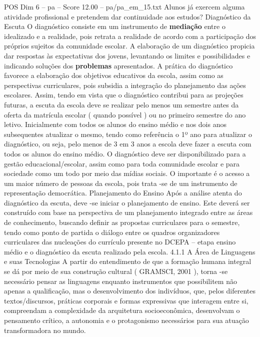 \begin{textsample}{POS Dim 6 – pa – Score 12.00 – pa/pa\_em\_15.txt}  \label{ex:f6_pos_062}
Alunos já exercem alguma atividade profissional e pretendem dar continuidade aos estudos?
Diagnóstico da Escuta O diagnóstico consiste em um instrumento de \textbf{mediação} entre o idealizado e a realidade, pois retrata a realidade de acordo com a participação dos próprios sujeitos da comunidade escolar.
A elaboração de um diagnóstico propicia dar respostas às expectativas dos jovens, levantando os limites e possibilidades e indicando soluções dos \textbf{problemas} apresentados.
A prática do diagnóstico favorece a elaboração dos objetivos educativos da escola, assim como as perspectivas curriculares, pois subsidia a integração do planejamento das ações escolares.
Assim, tendo em vista que o diagnóstico contribui para as projeções futuras, a escuta da escola deve se realizar pelo menos um semestre antes da oferta da matrícula escolar ( quando possível ) ou no primeiro semestre do ano letivo.
Inicialmente com todos os alunos do ensino médio e nos dois anos subsequentes atualizar o mesmo, tendo como referência o 1º ano para atualizar o diagnóstico, ou seja, pelo menos de 3 em 3 anos a escola deve fazer a escuta com todos os alunos do ensino médio.
O diagnóstico deve ser disponibilizado para a gestão educacional/escolar, assim como para toda comunidade escolar e para sociedade como um todo por meio das mídias sociais.
O importante é o acesso a um maior número de pessoas da escola, pois trata -se de um instrumento de representação democrática.
Planejamento do Ensino Após a análise atenta do diagnóstico da escuta, deve -se iniciar o planejamento de ensino.
Este deverá ser construído com base na perspectiva de um planejamento integrado entre as áreas de conhecimento, buscando definir as propostas curriculares para o semestre, tendo como ponto de partida o diálogo entre os quadros organizadores curriculares das nucleações do currículo presente no DCEPA – etapa ensino médio e o diagnóstico da escuta realizado pela escola. 4.1.1 A Área de Linguagens e suas Tecnologias A partir do entendimento de que a formação humana integral se dá por meio de sua construção cultural ( GRAMSCI, 2001 ), torna -se necessário pensar as linguagens enquanto instrumentos que possibilitem não apenas a qualificação, mas o desenvolvimento dos indivíduos, que, pelos diferentes textos/discursos, práticas corporais e formas expressivas que interagem entre si, compreendam a complexidade da arquitetura socioeconômica, desenvolvam o pensamento crítico, a autonomia e o protagonismo necessários para sua atuação transformadora no mundo.

\end{textsample}
